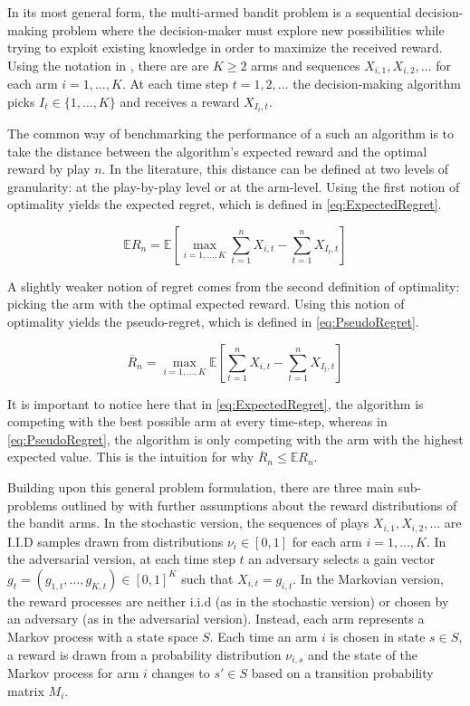 In its most general form, the multi-armed bandit problem is a sequential decision-making problem where the decision-maker must explore new possibilities while trying to exploit existing knowledge in order to maximize the received reward. Using the notation in \cite{bubeck12}, there are are $K \geq{2}$ arms and sequences $X_{i, 1}, X_{i, 2}, \ldots $ for each arm $i = 1, \ldots, K$. At each time step $t = 1, 2, \ldots$ the decision-making algorithm picks $I_t \in \{1, \ldots, K\}$ and receives a reward $X_{I_t, t}$.

The common way of benchmarking the performance of a such an algorithm is to take the distance between the algorithm's expected reward and the optimal reward by play $n$. In the literature, this distance can be defined at two levels of granularity: at the play-by-play level or at the arm-level. Using the first notion of optimality yields the expected regret, which is defined in \autoref{eq:ExpectedRegret}.

\begin{equation}
\label{eq:ExpectedRegret}
\mathbb{E}R_n = \mathbb{E}\left[ \max_{i=1, \ldots, K}{\sum_{t=1}^{n}{X_{i, t}}} - \sum_{t=1}^{n}{X_{I_t, t}}\right]
\end{equation}

A slightly weaker notion of regret comes from the second definition of optimality: picking the arm with the optimal expected reward. Using this notion of optimality yields the pseudo-regret, which is defined in \autoref{eq:PseudoRegret}.

\begin{equation}
\label{eq:PseudoRegret}
\overline{R}_n = \max_{i=1, \ldots, K}\mathbb{E}\left[\sum_{t=1}^{n}{X_{i, t}} - \sum_{t=1}^{n}{X_{I_t, t}}\right]
\end{equation}

It is important to notice here that in \autoref{eq:ExpectedRegret}, the algorithm is competing with the best possible arm at every time-step, whereas in \autoref{eq:PseudoRegret}, the algorithm is only competing with the arm with the highest expected value. This is the intuition for why $\overline{R}_n \leq{\mathbb{E}R_n}$.

Building upon this general problem formulation, there are three main sub-problems outlined by \cite{bubeck12} with further assumptions about the reward distributions of the bandit arms. In the stochastic version, the sequences of plays $X_{i, 1}, X_{i, 2}, \ldots $ are I.I.D samples drawn from distributions $\nu_i \in [0, 1]$ for each arm $i = 1, \ldots, K$. In the adversarial version, at each time step $t$ an adversary selects a gain vector $g_t = (g_{1, t}, \ldots, g_{K, t}) \in [0, 1]^{K}$ such that $X_{i, t} = g_{i, t}$. In the Markovian version, the reward processes are neither i.i.d (as in the stochastic version) or chosen by an adversary (as in the adversarial version). Instead, each arm represents a Markov process with a state space $S$. Each time an arm $i$ is chosen in state $s \in{S}$, a reward is drawn from a probability distribution $\nu_{i, s}$ and the state of the Markov process for arm $i$ changes to $s' \in {S}$ based on a transition probability matrix $M_i$.

